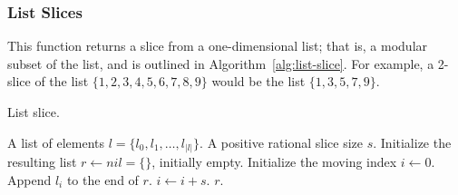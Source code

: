 \subsubsection{List Slices}
This function returns a slice from a one-dimensional list; that is, a modular subset of the list, and is outlined in Algorithm~\ref{alg:list-slice}.
For example, a 2-slice of the list  $\{1,2,3,4,5,6,7,8,9\}$ would be the list $\{1,3,5,7,9\}$.
\begin{algorithm}[H]
\caption{List slice.}
\label{alg:list-slice}
\begin{algorithmic}[1]
\INPUT A list of elements $l = \{l_0, l_1, \ldots, l_{|l|}\}$.
\INPUT A positive rational slice size $s$.
\STATE Initialize the resulting list $r \leftarrow nil = \{\}$, initially empty.
\STATE Initialize the moving index $i \leftarrow 0$.
    \STATE Append $l_i$ to the end of $r$.
  \ENDIF
  \STATE $i \leftarrow i + s$.
\ENDWHILE
\RETURN $r$.
\end{algorithmic}
\end{algorithm}
